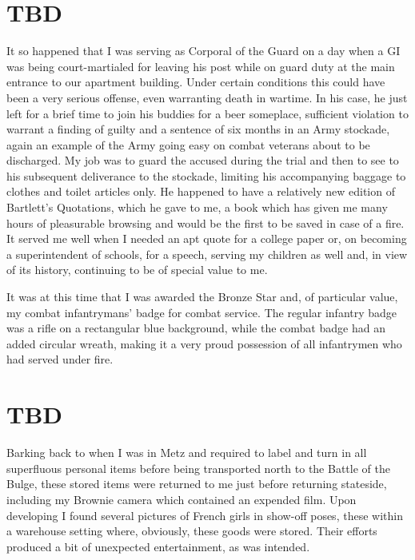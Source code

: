\documentclass[../m3y]{subfiles}
\begin{document}
\section{TBD}
It so happened that I was serving as Corporal of the Guard on a day when a GI was being court-martialed for leaving his post while on guard duty at the main entrance to our apartment building. Under certain conditions this could have been a very serious offense, even warranting death in wartime. In his case, he just left for a brief time to join his buddies for a beer someplace, sufficient violation to warrant a finding of guilty and a sentence of six months in an Army stockade, again an example of the Army going easy on combat veterans about to be discharged. My job was to guard the accused during the trial and then to see to his subsequent deliverance to the stockade, limiting his accompanying baggage to clothes and toilet articles only. He happened to have a relatively new edition of Bartlett's Quotations, which he gave to me, a book which has given me many hours of pleasurable browsing and would be the first to be saved in case of a fire. It served me well when I needed an apt quote for a college paper or, on becoming a superintendent of schools, for a speech, serving my children as well and, in view of its history, continuing to be of special value to me.

It was at this time that I was awarded the Bronze Star and, of particular value, my combat infantrymans' badge for combat service. The regular infantry badge was a rifle on a rectangular blue background, while the combat badge had an added circular wreath, making it a very proud possession of all infantrymen who had served under fire.

\section{TBD}
Barking back to when I was in Metz and required to label and turn in all superfluous personal items before being transported north to the Battle of the Bulge, these stored items were returned to me just before returning stateside, including my Brownie camera which contained an expended film. Upon developing I found several pictures of French girls in show-off poses, these within a warehouse setting where, obviously, these goods were stored. Their efforts produced a bit of unexpected entertainment, as was intended.
\end{document}
